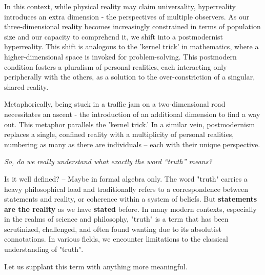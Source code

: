 \documentclass[11pt,a4]{article}
\begin{document}
In this context, while physical reality may claim universality, hyperreality introduces an extra dimension - the perspectives of multiple observers. As our three-dimensional reality becomes increasingly constrained in terms of population size and our capacity to comprehend it, we shift into a postmodernist hyperreality. This shift is analogous to the 'kernel trick' in mathematics, where a higher-dimensional space is invoked for problem-solving.
This postmodern condition fosters a pluralism of personal realities, each interacting only peripherally with the others, as a solution to the over-constriction of a singular, shared reality.

Metaphorically, being stuck in a traffic jam on a two-dimensional road necessitates an ascent - the introduction of an additional dimension to find a way out. This metaphor parallels the 'kernel trick.' In a similar vein, postmodernism replaces a single, confined reality with a multiplicity of personal realities, numbering as many as there are individuals – each with their unique perspective.


\par
\textit{So, do we really understand what exactly the word “truth” means?} \\
\par
Is it well defined? -- Maybe in formal algebra only. The word "truth" carries a heavy philosophical load and traditionally refers to a correspondence between statements and reality, or coherence within a system of beliefs. But \textbf{statements are the reality} as we have \textbf{stated} before.
In many modern contexts, especially in the realms of science and philosophy, "truth" is a term that has been scrutinized, challenged, and often found wanting due to its absolutist connotations.
In various fields, we encounter limitations to the classical understanding of "truth".


Let us supplant this term with anything more meaningful.
\end{document}

